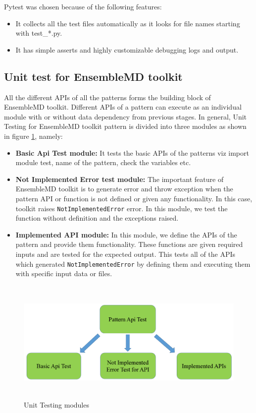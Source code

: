 \documentclass[10pt]{ruthesis}
\begin{document}
Pytest was chosen because of the following features:
\begin{itemize}
\item It collects all the test files automatically as it looks for file names starting with test\_*.py.
\item It has simple asserts and highly customizable debugging logs and output.
\end{itemize}

\subsection{Unit test for EnsembleMD toolkit}
All the different APIs of all the patterns forms the building block of EnsembleMD toolkit. Different APIs of a pattern can execute as an individual module with or without data dependency from previous stages. In general, Unit Testing for EnsembleMD toolkit pattern is divided into three modules as shown in figure \ref{fig:ut}, namely: 

\begin{itemize}
\item \textbf{Basic Api Test module:} It tests the basic APIs of the patterns viz import module test, name of the pattern, check the variables etc.
\item \textbf{Not Implemented Error test module:} The important feature of EnsembleMD toolkit is to generate error and throw exception when the pattern API or function is not defined or given any functionality. In this case, toolkit raises \texttt{NotImplementedError} error. In this module, we test the function without definition and the exceptions raised. 
\item \textbf{Implemented API module:} In this module, we define the APIs of the pattern and provide them functionality. These functions are given required inputs and are tested for the expected output. This tests all of the APIs which generated \texttt{NotImplementedError} by defining them and executing them with specific input data or files.
\end{itemize}

\begin{figure}
  \centering
  \includegraphics[width=17cm,height=6cm]{ut.png}
  \caption{Unit Testing modules}
  \label{fig:ut}
\end{figure}
\end{document}
